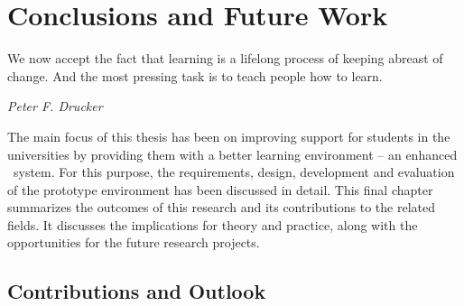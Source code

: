 \chapter{Conclusions and Future Work\label{cha:conclusion}}
\epigraph{We now accept the fact that learning is a lifelong process of keeping
abreast of change. And the most pressing task is to teach people how to
learn.}{\textit{Peter F. Drucker}}
The main focus of this thesis has been on improving \LLLs support for students
in the universities by providing them with a better learning environment -- an
enhanced \ep~system. For this purpose, the requirements, design, development and
evaluation of the prototype environment has been discussed in detail. This final
chapter summarizes the outcomes of this research and its contributions to the
related fields. It discusses the implications for theory and practice, along
with the opportunities for the future research projects.

\section{Contributions and Outlook}


